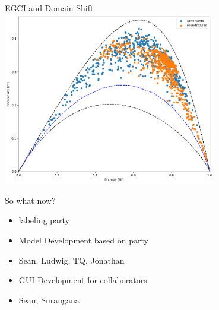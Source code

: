\begin{frame}{EGCI and Domain Shift}
    \centering
    \includegraphics[height=0.7\textheight,width=0.7\textwidth,keepaspectratio]{images/egci.png}
\end{frame}

\begin{frame}{So what now?}
    \begin{itemize}
        \item labeling party
        \item Model Development based on party
        \item Sean, Ludwig, TQ, Jonathan
        \item GUI Development for collaborators
        \item Sean, Surangana
    \end{itemize}
\end{frame}
